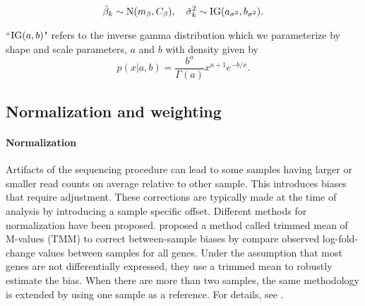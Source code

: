\begin{equation}
\tilde{\beta}_k \sim \operatorname{N}(m_\beta, C_\beta),\quad \tilde{\sigma}^2_k \sim \operatorname{IG}(a_{\sigma^2}, b_{\sigma^2}).
\end{equation}

``$\operatorname{IG}(a,b)$" refers to the inverse gamma distribution which we parameterize by shape and scale parameters, $a$ and $b$ with density given by
\begin{equation*}
p(x|a,b) = \frac{b^a}{\Gamma(a)}x^{a+1}e^{-b/x}.
\end{equation*}


%
%
%

\subsection{Normalization and weighting}
\label{norm-weight}
\paragraph{Normalization}
Artifacts of the sequencing procedure can lead to some samples having larger or smaller read counts on average relative to other sample. This introduces biases that require adjustment. These corrections are typically made at the time of analysis by introducing a sample specific offset. Different methods for normalization have been proposed. \citet{robinson2010} proposed a method called trimmed mean of M-values (TMM) to correct between-sample biases by compare observed log-fold-change values between samples for all genes. Under the assumption that most genes are not differentially expressed, they use a trimmed mean to robustly estimate the bias. When there are more than two samples, the same methodology is extended by using one sample as a reference. For details, see \citet{robinson2010}.

